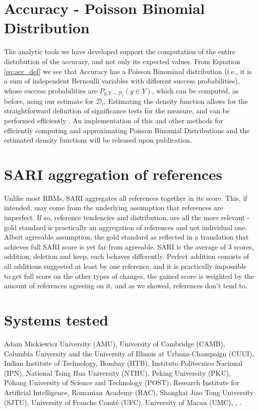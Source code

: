 \documentclass[letterpaper, 11pt]{article}
\begin{document}
\section{Accuracy - Poisson Binomial Distribution}\label{ap:poibin}
The analytic tools we have developed support the computation of the entire distribution of the accuracy, and not only its expected values. From Equation \ref{eq:acc_def} we see that Accuracy has a Poisson Binominal distribution (i.e., it is a sum of independent Bernoulli variables with different success probabilities), whose success probabilities are $P_{y,Y \sim \mathcal{D}_i}(y \in Y)$, which can be computed, as before, using our estimate for $\mathcal{D}_i$. Estimating the density function allows for the straightforward definition of significance tests for the measure, and can be performed efficiently \cite{hong2013computing}. An implementation of this and other methods for efficiently computing and approximating Poisson Binomial Distributions and the estimated density functions will be released upon publication.

\section{SARI aggregation of references}\label{ap:sari-assum}
Unlike most RBMs, SARI aggregates all references together in its score.
This, if intended, may come from the underlying assumption that references are imperfect. 
If so, reference tendencies and distribution, are all the more relevant - gold standard is practically an aggregation of references and not individual one. Albeit agreeable assumption, the gold standard as reflected in a translation that achieves full SARI score is yet far from agreeable.
SARI is the average of 3 scores, addition, deletion and keep, each behaves differently. Perfect addition consists of all additions suggested at least by one reference, and it is practically impossible to get full score on the other types of changes, the gained score is weighted by the amount of references agreeing on it, and as we showed, references don't tend to.

\section{Systems tested}\label{ap:abbr}
 Adam Mickiewicz University (AMU),
 University of Cambridge (CAMB), Columbia University and the University of Illinois at Urbana-Champaign (CUUI),
 Indian Institute of Technology, Bombay (IITB), Instituto Politecnico Nacional (IPN),
 National Tsing Hua University (NTHU), Peking University (PKU), Pohang University of Science and Technology (POST),
 Research Institute for Artificial Intelligence, Romanian Academy (RAC), Shanghai Jiao Tong University (SJTU),
 University of Franche Comt\'{e} (UFC), University of Macau (UMC), ,  .
\end{document}
